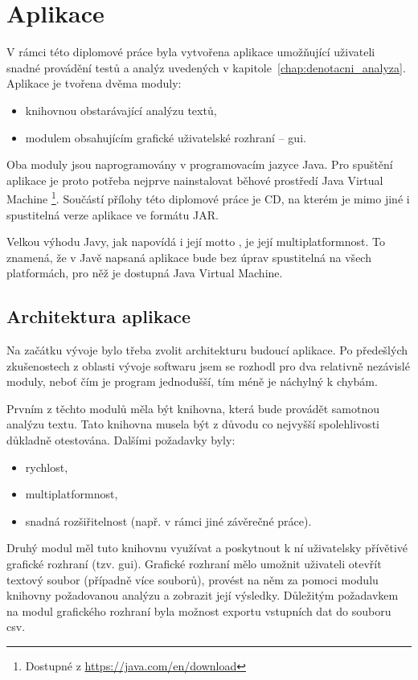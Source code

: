 \documentclass[dp.tex]{subfiles}
\begin{document}
\chapter{Aplikace}

V rámci této diplomové práce byla vytvořena aplikace umožňující uživateli snadné provádění testů a analýz uvedených v kapitole~\ref{chap:denotacni_analyza}. Aplikace je tvořena dvěma moduly:
\begin{itemize}
\item knihovnou obstarávající analýzu textů,
\item modulem obsahujícím grafické uživatelské rozhraní -- \acrshort{gui}.
\end{itemize}

Oba moduly jsou naprogramovány v programovacím jazyce Java. Pro spuštění aplikace je proto potřeba nejprve nainstalovat běhové prostředí Java Virtual Machine \footnote{Dostupné z \url {https://java.com/en/download}}. Součástí přílohy této diplomové práce je CD, na kterém je mimo jiné i spustitelná verze aplikace ve formátu JAR.

Velkou výhodu Javy, jak napovídá i její motto , je její multiplatformnost. To znamená, že v Javě napsaná aplikace bude bez úprav spustitelná na všech platformách, pro něž je dostupná Java Virtual Machine. 

\section{Architektura aplikace}

Na začátku vývoje bylo třeba zvolit architekturu budoucí aplikace. Po předešlých zkušenostech z oblasti vývoje softwaru jsem se rozhodl pro dva relativně nezávislé moduly, neboť čím je program jednodušší, tím méně je náchylný k chybám. 

Prvním z těchto modulů měla být knihovna, která bude provádět samotnou analýzu textu. Tato knihovna musela být z důvodu co nejvyšší spolehlivosti důkladně otestována. Dalšími požadavky byly:
\begin{itemize}
\item rychlost,
\item multiplatformnost,
\item snadná rozšiřitelnost (např. v rámci jiné závěrečné práce).
\end{itemize}

Druhý modul měl tuto knihovnu využívat a poskytnout k ní uživatelsky přívětivé grafické rozhraní (tzv. \acrshort{gui}). Grafické rozhraní mělo umožnit uživateli otevřít textový soubor (případně více souborů), provést na něm za pomoci modulu knihovny požadovanou analýzu a zobrazit její výsledky. Důležitým požadavkem na modul grafického rozhraní byla možnost exportu vstupních dat do souboru \acrshort{csv}. 
\end{document}

